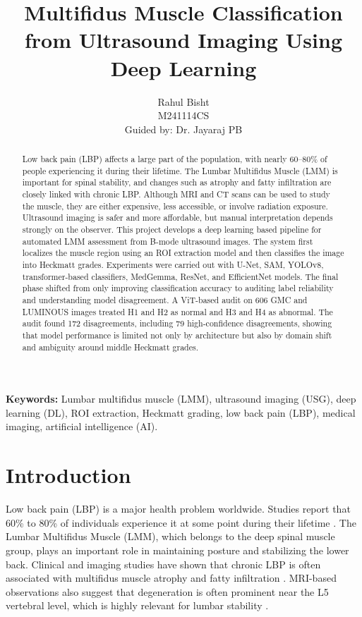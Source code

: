 \documentclass[twocolumn,10pt]{article}
\title{Multifidus Muscle Classification from Ultrasound Imaging Using Deep Learning}
\author{
    Rahul Bisht\\
    M241114CS\\
    Guided by: Dr. Jayaraj PB
}
\begin{document}
\maketitle

\begin{abstract}
Low back pain (LBP) affects a large part of the population, with nearly 60--80\% of people experiencing it during their lifetime. The Lumbar Multifidus Muscle (LMM) is important for spinal stability, and changes such as atrophy and fatty infiltration are closely linked with chronic LBP. Although MRI and CT scans can be used to study the muscle, they are either expensive, less accessible, or involve radiation exposure. Ultrasound imaging is safer and more affordable, but manual interpretation depends strongly on the observer. This project develops a deep learning based pipeline for automated LMM assessment from B-mode ultrasound images. The system first localizes the muscle region using an ROI extraction model and then classifies the image into Heckmatt grades. Experiments were carried out with U-Net, SAM, YOLOv8, transformer-based classifiers, MedGemma, ResNet, and EfficientNet models. The final phase shifted from only improving classification accuracy to auditing label reliability and understanding model disagreement. A ViT-based audit on 606 GMC and LUMINOUS images treated H1 and H2 as normal and H3 and H4 as abnormal. The audit found 172 disagreements, including 79 high-confidence disagreements, showing that model performance is limited not only by architecture but also by domain shift and ambiguity around middle Heckmatt grades.
\end{abstract}

\textbf{Keywords:} Lumbar multifidus muscle (LMM), ultrasound imaging (USG), deep learning (DL), ROI extraction, Heckmatt grading, low back pain (LBP), medical imaging, artificial intelligence (AI).

\section{Introduction}
\label{intro}
Low back pain (LBP) is a major health problem worldwide. Studies report that 60\% to 80\% of individuals experience it at some point during their lifetime \cite{Freeman2010}. The Lumbar Multifidus Muscle (LMM), which belongs to the deep spinal muscle group, plays an important role in maintaining posture and stabilizing the lower back. Clinical and imaging studies have shown that chronic LBP is often associated with multifidus muscle atrophy and fatty infiltration \cite{Vohra2016}. MRI-based observations also suggest that degeneration is often prominent near the L5 vertebral level, which is highly relevant for lumbar stability \cite{Vohra2016}.
\end{document}
